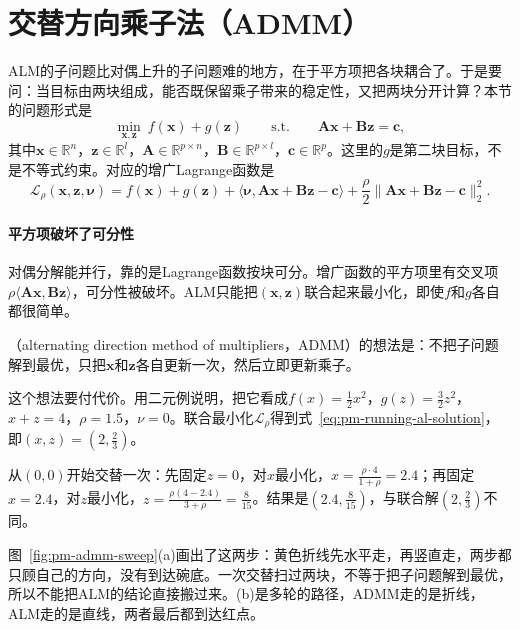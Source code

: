 \section{交替方向乘子法（ADMM）}
\label{sec:pm-admm}

ALM的子问题比对偶上升的子问题难的地方，在于平方项把各块耦合了。于是要问：当目标由两块组成，能否既保留乘子带来的稳定性，又把两块分开计算？本节的问题形式是
\begin{equation}
 \min_{\bm{x},\bm{z}}\ f(\bm{x})+g(\bm{z})\qquad\text{s.t.}\qquad\bm{A}\bm{x}+\bm{B}\bm{z}=\bm{c},
 \label{eq:pm-admm-problem}
\end{equation}
其中$\bm{x}\in\mathbb{R}^n$，$\bm{z}\in\mathbb{R}^l$，$\bm{A}\in\mathbb{R}^{p\times n}$，$\bm{B}\in\mathbb{R}^{p\times l}$，$\bm{c}\in\mathbb{R}^p$。这里的$g$是第二块目标，不是不等式约束。对应的增广Lagrange函数是
\begin{equation}
 \mathcal{L}_\rho(\bm{x},\bm{z},\bm{\nu})=f(\bm{x})+g(\bm{z})+\langle\bm{\nu},\bm{A}\bm{x}+\bm{B}\bm{z}-\bm{c}\rangle+\frac\rho2\lVert\bm{A}\bm{x}+\bm{B}\bm{z}-\bm{c}\rVert_2^2 .
 \label{eq:pm-admm-al}
\end{equation}

\paragraph{平方项破坏了可分性}
对偶分解能并行，靠的是Lagrange函数按块可分。增广函数的平方项里有交叉项$\rho\langle\bm{A}\bm{x},\bm{B}\bm{z}\rangle$，可分性被破坏。ALM只能把$(\bm{x},\bm{z})$联合起来最小化，即使$f$和$g$各自都很简单。

（alternating direction method of multipliers，ADMM）的想法是：不把子问题解到最优，只把$\bm{x}$和$\bm{z}$各自更新一次，然后立即更新乘子。

这个想法要付代价。用二元例说明，把它看成$f(x)=\tfrac12x^2$，$g(z)=\tfrac32z^2$，$x+z=4$，$\rho=1.5$，$\nu=0$。联合最小化$\mathcal{L}_\rho$得到式~\eqref{eq:pm-running-al-solution}，即$(x,z)=(2,\tfrac23)$。

从$(0,0)$开始交替一次：先固定$z=0$，对$x$最小化，$x=\tfrac{\rho\cdot4}{1+\rho}=2.4$；再固定$x=2.4$，对$z$最小化，$z=\tfrac{\rho(4-2.4)}{3+\rho}=\tfrac{8}{15}$。结果是$(2.4,\tfrac{8}{15})$，与联合解$(2,\tfrac23)$不同。

图~\ref{fig:pm-admm-sweep}(a)画出了这两步：黄色折线先水平走，再竖直走，两步都只顾自己的方向，没有到达碗底。一次交替扫过两块，不等于把子问题解到最优，所以不能把ALM的结论直接搬过来。(b)是多轮的路径，ADMM走的是折线，ALM走的是直线，两者最后都到达红点。

